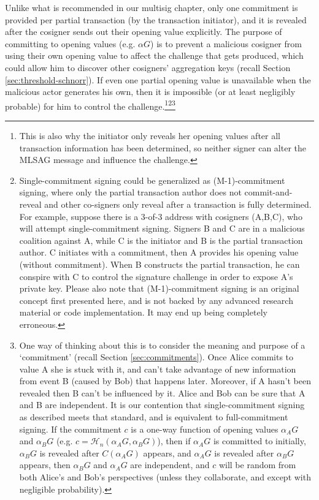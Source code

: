 Unlike what is recommended in our multisig chapter, only one commitment is provided per partial transaction (by the transaction initiator), and it is revealed after the cosigner sends out their opening value explicitly. The purpose of committing to opening values (e.g. $\alpha G$) is to prevent a malicious cosigner from using their own opening value to affect the challenge that gets produced, which could allow him to discover other cosigners' aggregation keys (recall Section \ref{sec:threshold-schnorr}). If even one partial opening value is unavailable when the malicious actor generates his own, then it is impossible (or at least negligibly probable) for him to control the challenge.\footnote{This is also why the initiator only reveals her opening values after all transaction information has been determined, so neither signer can alter the MLSAG message and influence the challenge.}\footnote{Single-commitment signing could be generalized as (M-1)-commitment signing, where only the partial transaction author does not commit-and-reveal and other co-signers only reveal after a transaction is fully determined. For example, suppose there is a 3-of-3 address with cosigners (A,B,C), who will attempt single-commitment signing. Signers B and C are in a malicious coalition against A, while C is the initiator and B is the partial transaction author. C initiates with a commitment, then A provides his opening value (without commitment). When B constructs the partial transaction, he can conspire with C to control the signature challenge in order to expose A's private key. Please also note that (M-1)-commitment signing is an original concept first presented here, and is not backed by any advanced research material or code implementation. It may end up being completely erroneous.}\footnote{One way of thinking about this is to consider the meaning and purpose of a `commitment' (recall Section \ref{sec:commitments}). Once Alice commits to value A she is stuck with it, and can't take advantage of new information from event B (caused by Bob) that happens later. Moreover, if A hasn't been revealed then B can't be influenced by it. Alice and Bob can be sure that A and B are independent. It is our contention that single-commitment signing as described meets that standard, and is equivalent to full-commitment signing. If the commitment $c$ is a one-way function of opening values $\alpha_A G$ and $\alpha_B G$ (e.g. $c = \mathcal{H}_n(\alpha_A G,\alpha_B G)$), then if $\alpha_A G$ is committed to initially, $\alpha_B G$ is revealed after $C(\alpha_A G)$ appears, and $\alpha_A G$ is revealed after $\alpha_B G$ appears, then $\alpha_B G$ and $\alpha_A G$ are independent, and $c$ will be random from both Alice's and Bob's perspectives (unless they collaborate, and except with negligible probability).}

